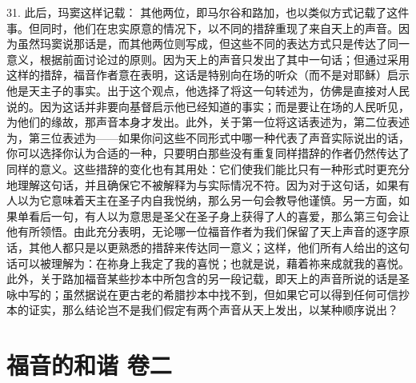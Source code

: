 31. 此后，玛窦这样记载： 其他两位，即马尔谷和路加，也以类似方式记载了这件事。但同时，他们在忠实原意的情况下，以不同的措辞重现了来自天上的声音。因为虽然玛窦说那话是，而其他两位则写成，但这些不同的表达方式只是传达了同一意义，根据前面讨论过的原则。因为天上的声音只发出了其中一句话；但通过采用这样的措辞，福音作者意在表明，这话是特别向在场的听众（而不是对耶稣）启示他是天主子的事实。出于这个观点，他选择了将这一句转述为，仿佛是直接对人民说的。因为这话并非要向基督启示他已经知道的事实；而是要让在场的人民听见，为他们的缘故，那声音本身才发出。此外，关于第一位将这话表述为，第二位表述为，第三位表述为——如果你问这些不同形式中哪一种代表了声音实际说出的话，你可以选择你认为合适的一种，只要明白那些没有重复同样措辞的作者仍然传达了同样的意义。这些措辞的变化也有其用处：它们使我们能比只有一种形式时更充分地理解这句话，并且确保它不被解释为与实际情况不符。因为对于这句话，如果有人以为它意味着天主在圣子内自我悦纳，那么另一句会教导他谨慎。另一方面，如果单看后一句，有人以为意思是圣父在圣子身上获得了人的喜爱，那么第三句会让他有所领悟。由此充分表明，无论哪一位福音作者为我们保留了天上声音的逐字原话，其他人都只是以更熟悉的措辞来传达同一意义；这样，他们所有人给出的这句话可以被理解为：在祢身上我定了我的喜悦；也就是说，藉着祢来成就我的喜悦。此外，关于路加福音某些抄本中所包含的另一段记载，即天上的声音所说的话是圣咏中写的；虽然据说在更古老的希腊抄本中找不到，但如果它可以得到任何可信抄本的证实，那么结论岂不是我们假定有两个声音从天上发出，以某种顺序说出？\par



\section{福音的和谐 卷二}

